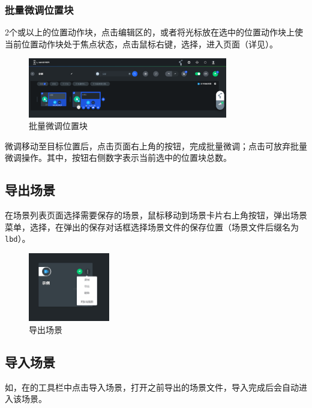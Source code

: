 
\subsubsection{批量微调位置块}
\ttt 2个或以上的位置动作块，点击编辑区的，或者将光标放在选中的位置动作块上使当前位置动作块处于焦点状态，点击鼠标右键，选择，进入页面（详见）。

\begin{figure}[hb]
	\centering
	\includegraphics[height=2.6cm]{screen/3-18.png}
	\caption{批量微调位置块}
	\label{fig:批量微调位置块}
\end{figure}

微调移动至目标位置后，点击页面右上角的按钮，完成批量微调；点击可放弃批量微调操作。其中，按钮右侧数字表示当前选中的位置块总数。


\subsection{导出场景}
在场景列表页面选择需要保存的场景，鼠标移动到场景卡片右上角按钮，弹出场景菜单，选择，在弹出的保存对话框选择场景文件的保存位置（场景文件后缀名为 \verb|lbd|）。

\begin{figure}[htb!]
	\centering
	\includegraphics[height=3cm]{screen/3-19.png}
	\caption{导出场景}
	\label{fig:导出场景}
\end{figure}

\subsection{导入场景}
如，在的工具栏中点击导入场景，打开之前导出的场景文件，导入完成后会自动进入该场景。

